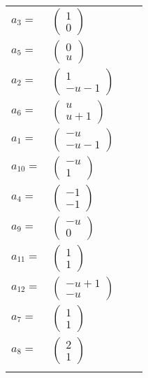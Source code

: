 \documentclass[1p]{elsarticle_modified}
\theoremstyle{definition}
\begin{document}
\begin{tabular}{m{7pt} m{180pt} m{7pt} m{180pt} }
\flushright $a_{3}=$&$\begin{pmatrix}1\\0\end{pmatrix}$ \\
\flushright $a_{5}=$&$\begin{pmatrix}0\\u\end{pmatrix}$ \\
\flushright $a_{2}=$&$\begin{pmatrix}1\\- u-1\end{pmatrix}$ \\
\flushright $a_{6}=$&$\begin{pmatrix}u\\u+1\end{pmatrix}$ \\
\flushright $a_{1}=$&$\begin{pmatrix}- u\\- u-1\end{pmatrix}$ \\
\flushright $a_{10}=$&$\begin{pmatrix}- u\\1\end{pmatrix}$ \\
\flushright $a_{4}=$&$\begin{pmatrix}-1\\-1\end{pmatrix}$ \\
\flushright $a_{9}=$&$\begin{pmatrix}- u\\0\end{pmatrix}$ \\
\flushright $a_{11}=$&$\begin{pmatrix}1\\1\end{pmatrix}$ \\
\flushright $a_{12}=$&$\begin{pmatrix}- u+1\\- u\end{pmatrix}$ \\
\flushright $a_{7}=$&$\begin{pmatrix}1\\1\end{pmatrix}$ \\
\flushright $a_{8}=$&$\begin{pmatrix}2\\1\end{pmatrix}$\\&\end{tabular}
\end{document}
